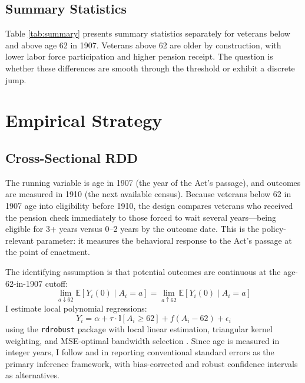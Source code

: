 \documentclass[12pt]{article}
\newcommand{\E}{\mathbb{E}}
\newcommand{\ind}{\mathbb{I}}
\begin{document}
\subsection{Summary Statistics}



Table \ref{tab:summary} presents summary statistics separately for veterans below and above age 62 in 1907. Veterans above 62 are older by construction, with lower labor force participation and higher pension receipt. The question is whether these differences are smooth through the threshold or exhibit a discrete jump.


\section{Empirical Strategy}

\subsection{Cross-Sectional RDD}

The running variable is age in 1907 (the year of the Act's passage), and outcomes are measured in 1910 (the next available census). Because veterans below 62 in 1907 age into eligibility before 1910, the design compares veterans who received the pension check immediately to those forced to wait several years---being eligible for 3+ years versus 0--2 years by the outcome date. This is the policy-relevant parameter: it measures the behavioral response to the Act's passage at the point of enactment.

The identifying assumption is that potential outcomes are continuous at the age-62-in-1907 cutoff:
\begin{equation}
\lim_{a \downarrow 62} \E[Y_i(0) \mid A_i = a] = \lim_{a \uparrow 62} \E[Y_i(0) \mid A_i = a]
\end{equation}
I estimate local polynomial regressions:
\begin{equation}
Y_i = \alpha + \tau \cdot \ind[A_i \geq 62] + f(A_i - 62) + \epsilon_i
\end{equation}
using the \texttt{rdrobust} package \citep{calonico2014robust} with local linear estimation, triangular kernel weighting, and MSE-optimal bandwidth selection \citep{imbens2012optimal}. Since age is measured in integer years, I follow \citet{cattaneo2020practical} and \citet{LeeCard2008} in reporting conventional standard errors as the primary inference framework, with bias-corrected and robust confidence intervals as alternatives.
\end{document}
